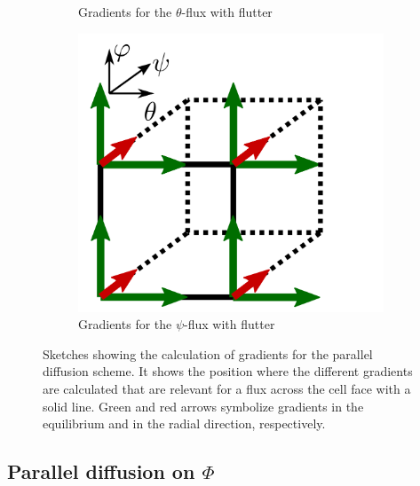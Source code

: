 \begin{figure}[H]
\begin{subfigure}[t]{0.32\textwidth}
		\caption{ Gradients for the $\theta$-flux with flutter}
		\label{fig:Gunter3D_theta} 
	\end{subfigure}
	\begin{subfigure}[t]{0.32\textwidth}
		\centering
		\includegraphics[width=\textwidth]{schemes/Gunter3D_psi.png}
		\caption{ Gradients for the $\psi$-flux with flutter}
		\label{fig:GunterD_psi}
	\end{subfigure}
	\caption{Sketches showing the calculation of gradients for the parallel diffusion scheme. It shows the position where the different gradients are calculated that are relevant for a flux across the cell face with a solid line. Green and red arrows symbolize gradients in the equilibrium and in the radial direction, respectively.}
	\label{fig:GunterStencils_flutter}
\end{figure}



\subsection{Parallel diffusion on $\Phi$}

